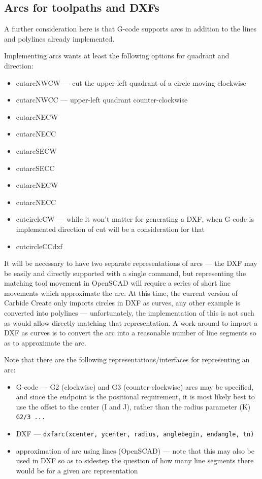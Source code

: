 \documentclass{ltxdoc}
\begin{document}
\subsection{Arcs for toolpaths and DXFs}
 
A further consideration here is that G-code supports arcs in addition to the lines and
polylines already implemented. 

Implementing arcs wants at least the following options for quadrant and direction:
 
\begin{itemize}
\item cutarcNWCW --- cut the upper-left quadrant of a circle moving clockwise
\item cutarcNWCC --- upper-left quadrant counter-clockwise
\item cutarcNECW
\item cutarcNECC
\item cutarcSECW
\item cutarcSECC
\item cutarcNECW
\item cutarcNECC
\item cutcircleCW --- while it won’t matter for generating a DXF, when G-code is implemented
                      direction of cut will be a consideration for that
\item cutcircleCCdxf
\end{itemize}
 
It will be necessary to have two separate representations of arcs --- the DXF may be easily 
and directly supported with a single command, but representing the matching tool movement
in OpenSCAD will require a series of short line movements which approximate the arc. 
At this time, the current version of Carbide Create only imports circles in DXF as curves,
any other example is converted into polylines --- unfortunately, the implementation of this
is not such as would allow directly matching that representation. A work-around to import
a DXF as curves is to convert the arc into a reasonable number of line segments so as to
approximate the arc.
 
\begin{samepage}
Note that there are the following representations/interfaces for representing an arc:
 
\begin{itemize}
\item G-code --- G2 (clockwise) and G3 (counter-clockwise) arcs may be specified, and since 
      the endpoint is the positional requirement, it is most likely best to use the offset 
      to the center (I and J), rather than the radius parameter (K) \texttt{G2/3 ...} 
\item DXF --- \texttt{dxfarc(xcenter, ycenter, radius, anglebegin, endangle, tn)}
\item approximation of arc using lines (OpenSCAD) --- note that this may also be used 
      in DXF so as to sidestep the question of how many line segments there would be
      for a given arc representation 
\end{itemize}
\end{samepage}
 
\end{document}
